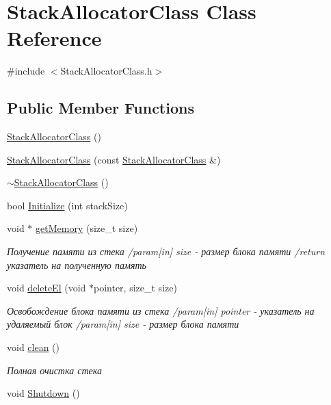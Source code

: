 \hypertarget{class_stack_allocator_class}{}\section{Stack\+Allocator\+Class Class Reference}
\label{class_stack_allocator_class}


{\ttfamily \#include $<$Stack\+Allocator\+Class.\+h$>$}

\subsection*{Public Member Functions}
\begin{DoxyCompactItemize}
\item 
\hyperlink{class_stack_allocator_class_aea7c5e14b9c04f98cbfdcabffb8752f7}{Stack\+Allocator\+Class} ()
\item 
\hyperlink{class_stack_allocator_class_af0066ea1cbe51c847447a036b4d1c085}{Stack\+Allocator\+Class} (const \hyperlink{class_stack_allocator_class}{Stack\+Allocator\+Class} \&)
\item 
\hyperlink{class_stack_allocator_class_ab23a6a512e9e878fa0863ba45c7b878a}{$\sim$\+Stack\+Allocator\+Class} ()
\item 
bool \hyperlink{class_stack_allocator_class_aaee70832aedfa3d1c6b828131165e24a}{Initialize} (int stack\+Size)
\item 
void $\ast$ \hyperlink{class_stack_allocator_class_a206f0f9c4966103cbd5f3bcb9226c5b6}{get\+Memory} (size\+\_\+t size)
\begin{DoxyCompactList}\small\item\em Получение памяти из стека /param\mbox{[}in\mbox{]} size -\/ размер блока памяти /return указатель на полученную память \end{DoxyCompactList}\item 
void \hyperlink{class_stack_allocator_class_ae855ca80c4d69b42e2e05fd92e7a79e2}{delete\+El} (void $\ast$pointer, size\+\_\+t size)
\begin{DoxyCompactList}\small\item\em Освобождение блока памяти из стека /param\mbox{[}in\mbox{]} pointer -\/ указатель на удаляемый блок /param\mbox{[}in\mbox{]} size -\/ размер блока памяти \end{DoxyCompactList}\item 
void \hyperlink{class_stack_allocator_class_a432a6bb89e0e9e68b9a46a81ca6a9766}{clean} ()
\begin{DoxyCompactList}\small\item\em Полная очистка стека \end{DoxyCompactList}\item 
void \hyperlink{class_stack_allocator_class_a5e3a6a3d4d5cdbd1580f7e0804abb3d0}{Shutdown} ()
\end{DoxyCompactItemize}

